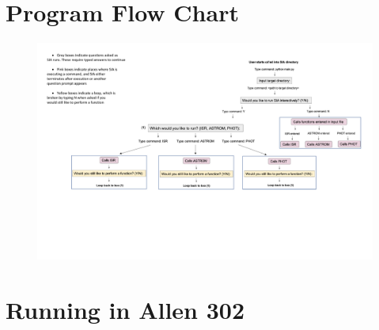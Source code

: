 \documentclass[11pt]{report}
\begin{document}
\section{Program Flow Chart}
\begin{figure}[h!]
\begin{center}
\includegraphics[width=1.1\textwidth]{SIA_flow_chart.pdf}
\end{center}
\end{figure}
\section{Running in Allen 302}
\end{document}
